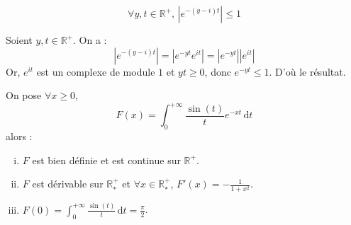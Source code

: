 



	
	\begin{lemma}
		\label{integrale-dirichlet-1}
		\[ \forall y, t \in \mathbb{R}^+, \, |e^{-(y-i)t}| \leq 1 \]
	\end{lemma}

	\begin{demonstration}
		Soient $y, t \in \mathbb{R}^+$. On a :
		\[ |e^{-(y-i)t}| = |e^{-yt} e^{it}| = |e^{-yt}| |e^{it}| \]
		Or, $e^{it}$ est un complexe de module $1$ et $yt \geq 0$, donc $e^{-yt} \leq 1$. D'où le résultat.
	\end{demonstration}


	\begin{theorem}
		On pose $\forall x \geq 0$,
		\[ F(x) = \int_0^{+\infty} \frac{\sin(t)}{t} e^{-xt} \, \mathrm{d}t \]
		alors :
		\begin{enumerate}[(i)]
			\item $F$ est bien définie et est continue sur $\mathbb{R}^+$.
			\item $F$ est dérivable sur $\mathbb{R}^+_*$ et $\forall x \in \mathbb{R}^+_*$, $F'(x) = -\frac{1}{1+x^2}$.
			\item $F(0) = \int_0^{+\infty} \frac{\sin(t)}{t} \, \mathrm{d}t = \frac{\pi}{2}$.
		\end{enumerate}
	\end{theorem}



